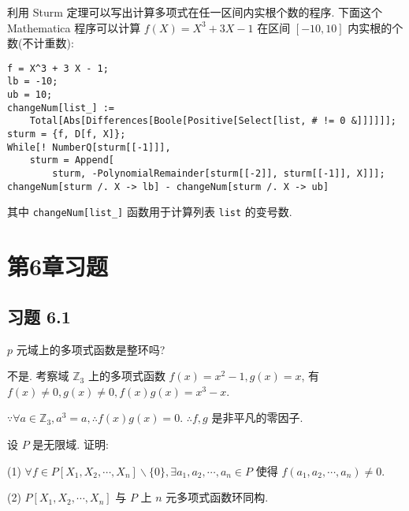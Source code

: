 \documentclass[color=black,device=normal,lang=cn,mode=geye]{elegantnote}
\begin{document}
利用 Sturm 定理可以写出计算多项式在任一区间内实根个数的程序. 下面这个 Mathematica 程序可以计算 $f(X)=X^3+3X-1$ 在区间 $[-10,10]$ 内实根的个数(不计重数):
\begin{lstlisting}
f = X^3 + 3 X - 1;
lb = -10;
ub = 10;
changeNum[list_] := 
    Total[Abs[Differences[Boole[Positive[Select[list, # != 0 &]]]]]];
sturm = {f, D[f, X]};
While[! NumberQ[sturm[[-1]]], 
    sturm = Append[
        sturm, -PolynomialRemainder[sturm[[-2]], sturm[[-1]], X]]];
changeNum[sturm /. X -> lb] - changeNum[sturm /. X -> ub]
\end{lstlisting}
其中 \verb|changeNum[list_]| 函数用于计算列表 \verb|list| 的变号数.
\section{第6章习题}
\subsection{习题 6.1}
\begin{exercise}%
    $p$ 元域上的多项式函数是整环吗?
\end{exercise}
\begin{solution}
    不是. 考察域 $\mathbb{Z}_3$ 上的多项式函数 $f(x)=x^2-1,g(x)=x$, 有 $f(x)\neq0,g(x)\neq0,f(x)g(x)=x^3-x$.

    $\because\forall a\in\mathbb{Z}_3,a^3=a,\therefore f(x)g(x)=0$. $\therefore f,g$ 是非平凡的零因子.
\end{solution}
\begin{exercise}%
    设 $P$ 是无限域. 证明:
    
    (1) $\forall f\in P[X_1,X_2,\cdots,X_n]\backslash\{0\},\exists a_1,a_2,\cdots,a_n\in P$ 使得 $f(a_1,a_2,\cdots,a_n)\neq0$.

    (2) $P[X_1,X_2,\cdots,X_n]$ 与 $P$ 上 $n$ 元多项式函数环同构.
\end{exercise}
\end{document}
